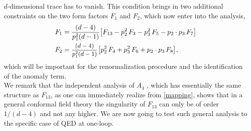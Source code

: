 \documentclass[a4paper,11pt,openright,twoside]{book}
\newcommand{\sdfrac}[2]{\mbox{\small$\displaystyle\frac{#1}{#2}$}}
\numberwithin{equation}{section}
\begin{document}
{{$d$-dimensional trace has to vanish. 
This condition brings in two additional constraints on the two form factors $F_1$ and $F_2$, which now enter into the analysis,  
\begin{align}
	F_1&=\frac{(d-4)}{p_1^2(d-1)}\big[F_{13}-p_2^2\,F_3-p_3^2\,F_5-p_2\cdot p_3\, F_7\big]\\
	F_2&=\sdfrac{(d-4)}{p_1^2(d-1)}\big[p_2^2\,F_4+p_3^2\,F_6+p_2\cdot p_3\,F_8\big],
	\label{confeq}
\end{align}
which will be important for the renormalization procedure and the identification of the anomaly term. \\
We remark that the independent analysis of $A_4$ \cite{Bzowski:2017poo}, which has essentially the same structure 
as $F_{13}$, as one can immediately realize from \eqref{mapping}, shows that in a general conformal field theory the singularity of $F_{13}$ can only be of order $1/(d-4)$ 
and not any higher. We are now going to test such general analysis to the specific case of QED at one-loop.
}}
\end{document}
